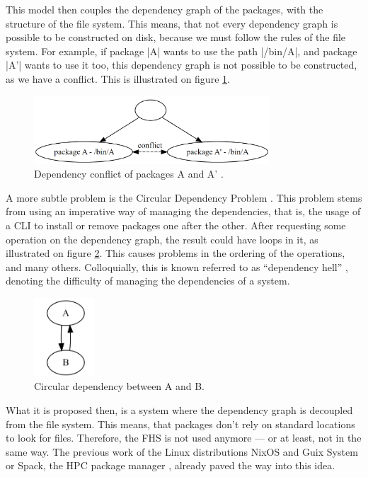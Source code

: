 This model then couples the dependency graph of the packages, with the structure
of the file system. This means, that not every dependency graph is possible to
be constructed on disk, because we must follow the rules of the file system. For
example, if package |A| wants to use the path |/bin/A|, and package |A'| wants
to use it too, this dependency graph is not possible to be constructed, as we
have a conflict. This is illustrated on figure \ref{fig:graph2}.

\begin{figure}
    \centering
    \includegraphics[width=250pt]{Screenshot 2023-05-29 153351.png}
    \caption{Dependency conflict of packages A and A' .}
    \label{fig:graph2}
\end{figure}

A more subtle problem is the Circular Dependency Problem \cite{al-mutawaShapeCircularDependencies2014}. This problem stems
from using an imperative way of managing the dependencies, that is, the usage of
a \ac{CLI} to install or remove packages one after the
other. After requesting some operation on the dependency graph, the result could have
loops in it, as illustrated on figure \ref{fig:graph3}. This causes problems in
the ordering of the operations, and many others. Colloquially, this is known referred to as
``dependency hell'' \cite{abateDependencySolvingStill2020}, denoting the difficulty of managing the dependencies of a system.

\begin{figure}
    \centering
    \includegraphics[width=0.2\textwidth]{Screenshot 2023-05-29 154056.png}
    \caption{Circular dependency between A and B.}
    \label{fig:graph3}
\end{figure}

What it is proposed then, is a system where the dependency graph is decoupled
from the file system. This means, that packages don't rely on standard locations
to look for files. Therefore, the \ac{FHS} is not used anymore --- or at least, not
in the same way. The previous work of the Linux distributions
NixOS \cite{dolstraPurelyFunctionalSoftware2006} and Guix System
\cite{courtesFunctionalPackageManagement2013} or Spack, the \ac{HPC} package
manager \cite{gamblinSpackPackageManager2015}, already paved the way into this idea.

